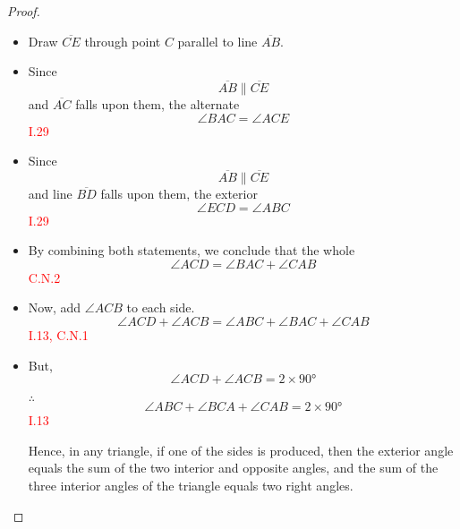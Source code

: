 \begin{proof}

\begin{itemize}

\item[]

    \item Draw $\overline{CE}$ through point $C$ parallel to line $\overline{AB}$.

\begin{figure}[H]
	\caption{}
\end{figure}

\item Since 
\[\overline{AB} \parallel  \overline{CE}\] 
and $\overline{AC}$ falls upon them, the alternate 
\[\angle{BAC} = \angle{ACE}\]\hfill\textcolor{red}{I.29}

\item Since 
\[\overline{AB} \parallel  \overline{CE}\] 
and line $\overline{BD}$ falls upon them, the exterior 
\[\angle{ECD} = \angle{ABC}\] \hfill\textcolor{red}{I.29}

\item By combining both statements, we conclude that the whole 
\[\angle{ACD} =\angle{BAC} + \angle{CAB}\] \hfill\textcolor{red}{C.N.2}

\item Now, add $\angle{ACB}$ to each side. 
\[\angle{ACD} + \angle{ACB} = \angle{ABC}+ \angle{BAC}+ \angle{CAB}\]\hfill\textcolor{red}{I.13, C.N.1}

\item But,
\[\angle{ACD} + \angle{ACB} = 2\times\ang{90}\]

\clearpage

\item[$\therefore$] 
\[\angle{ABC}+ \angle{BCA} + \angle{CAB} = 2\times\ang{90}\]\hfill\textcolor{red}{I.13}

Hence, in any triangle, if one of the sides is produced, then the exterior angle equals the sum of the two interior and opposite angles, and the sum of the three interior angles of the triangle equals two right angles.

\end{itemize}

\end{proof}

\clearpage
